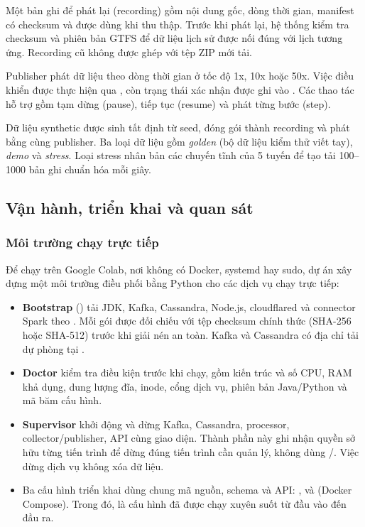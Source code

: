 Một bản ghi để phát lại (recording) gồm nội dung gốc, dòng thời gian, manifest có checksum và  được dùng khi thu thập. Trước khi phát lại, hệ thống kiểm tra checksum và phiên bản GTFS để dữ liệu lịch sử được nối đúng với lịch tương ứng. Recording cũ không được ghép với tệp ZIP mới tải.

Publisher phát dữ liệu theo dòng thời gian ở tốc độ 1x, 10x hoặc 50x. Việc điều khiển được thực hiện qua , còn trạng thái xác nhận được ghi vào . Các thao tác hỗ trợ gồm tạm dừng (pause), tiếp tục (resume) và phát từng bước (step).

Dữ liệu synthetic được sinh tất định từ seed, đóng gói thành recording và phát bằng cùng publisher. Ba loại dữ liệu gồm \textit{golden} (bộ dữ liệu kiểm thử viết tay), \textit{demo} và \textit{stress}. Loại stress nhân bản các chuyến tĩnh của 5 tuyến để tạo tải 100--1000 bản ghi chuẩn hóa mỗi giây.

\subsection{Vận hành, triển khai và quan sát}

\subsubsection{Môi trường chạy trực tiếp}

Để chạy trên Google Colab, nơi không có Docker, systemd hay sudo, dự án xây dựng một môi trường điều phối bằng Python cho các dịch vụ chạy trực tiếp:
\begin{itemize}
    \item \textbf{Bootstrap} () tải JDK, Kafka, Cassandra, Node.js, cloudflared và connector Spark theo . Mỗi gói được đối chiếu với tệp checksum chính thức (SHA-256 hoặc SHA-512) trước khi giải nén an toàn. Kafka và Cassandra có địa chỉ tải dự phòng tại .
    \item \textbf{Doctor} kiểm tra điều kiện trước khi chạy, gồm kiến trúc và số CPU, RAM khả dụng, dung lượng đĩa, inode, cổng dịch vụ, phiên bản Java/Python và mã băm cấu hình.
    \item \textbf{Supervisor} khởi động và dừng Kafka, Cassandra, processor, collector/publisher, API cùng giao diện. Thành phần này ghi nhận quyền sở hữu từng tiến trình để dừng đúng tiến trình cần quản lý, không dùng /. Việc dừng dịch vụ không xóa dữ liệu.
    \item Ba cấu hình triển khai dùng chung mã nguồn, schema và API: ,  và  (Docker Compose). Trong đó,  là cấu hình đã được chạy xuyên suốt từ đầu vào đến đầu ra.
\end{itemize}

